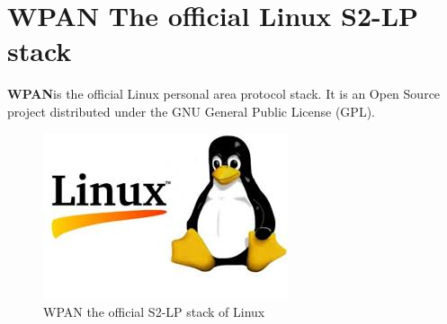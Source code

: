 \section{WPAN The official Linux S2-LP stack}
\textbf{WPAN}is the official Linux personal area protocol stack. It is an Open Source project distributed under the GNU General Public License (GPL).
\begin{figure}[ht]
	\centering
	\includegraphics[scale=1]{images/linux.png}
	\caption{WPAN the official S2-LP stack of Linux}
\end{figure}
